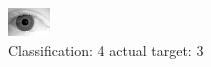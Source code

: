 \begin{figure}[h!]
\begin{center}
\includegraphics[width=0.60\columnwidth]{figures/ID2180_class_4_target_3.png}
\end{center}
\caption{ Classification: 4 actual target: 3}
\label{fig:ID2180_class_4_target_3}
\end{figure}
